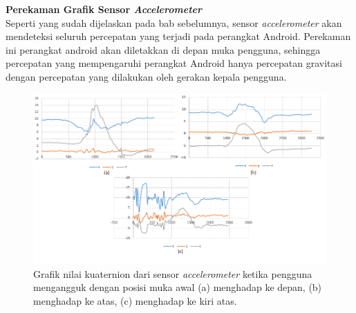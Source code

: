 \documentclass[a4paper,twoside]{article}
\begin{document}
\begin{enumerate}
\textbf{Perekaman Grafik Sensor \textit{Accelerometer}}\\

\label{sec:analisis_grafik_sensor_accelerometer}
Seperti yang sudah dijelaskan pada bab sebelumnya, sensor \textit{accelerometer} akan mendeteksi seluruh percepatan yang terjadi pada perangkat Android. Perekaman ini perangkat android akan diletakkan di depan muka pengguna, sehingga percepatan yang mempengaruhi perangkat Android hanya percepatan gravitasi dengan percepatan yang dilakukan oleh gerakan kepala pengguna. 

\begin{figure}[htbp]
\centering
\includegraphics[scale=0.6]{Gambar/grafik-sensor-accelerometer-mengangguk.png}
\caption{Grafik nilai kuaternion dari sensor \textit{accelerometer} ketika pengguna mengangguk dengan posisi muka awal (a) menghadap ke depan, (b) menghadap ke atas, (c) menghadap ke kiri atas.} 
\label{fig:grafik-sensor-accelerometer-mengangguk}
\end{figure}


\end{enumerate}
\end{document}
